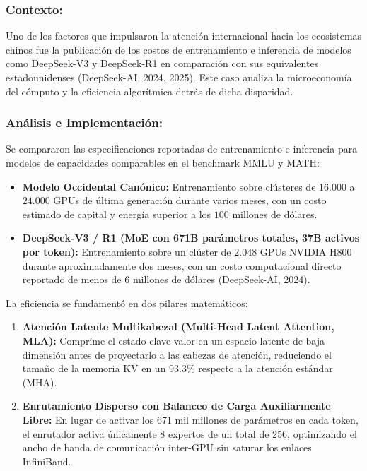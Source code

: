 \subsubsection*{Contexto:}
Uno de los factores que impulsaron la atención internacional hacia los ecosistemas chinos fue la publicación de los costos de entrenamiento e inferencia de modelos como DeepSeek-V3 y DeepSeek-R1 en comparación con sus equivalentes estadounidenses (DeepSeek-AI, 2024, 2025). Este caso analiza la microeconomía del cómputo y la eficiencia algorítmica detrás de dicha disparidad.

\subsubsection*{Análisis e Implementación:}
Se compararon las especificaciones reportadas de entrenamiento e inferencia para modelos de capacidades comparables en el benchmark MMLU y MATH:
\begin{itemize}
    \item \textbf{Modelo Occidental Canónico:} Entrenamiento sobre clústeres de $16.000$ a $24.000$ GPUs de última generación durante varios meses, con un costo estimado de capital y energía superior a los $100$ millones de dólares.
    \item \textbf{DeepSeek-V3 / R1 (MoE con 671B parámetros totales, 37B activos por token):} Entrenamiento sobre un clúster de $2.048$ GPUs NVIDIA H800 durante aproximadamente dos meses, con un costo computacional directo reportado de menos de $6$ millones de dólares (DeepSeek-AI, 2024).
\end{itemize}

La eficiencia se fundamentó en dos pilares matemáticos:
\begin{enumerate}[label=\arabic*., leftmargin=2em]
    \item \textbf{Atención Latente Multikabezal (Multi-Head Latent Attention, MLA):} Comprime el estado clave-valor en un espacio latente de baja dimensión antes de proyectarlo a las cabezas de atención, reduciendo el tamaño de la memoria KV en un $93.3\%$ respecto a la atención estándar (MHA).
    \item \textbf{Enrutamiento Disperso con Balanceo de Carga Auxiliarmente Libre:} En lugar de activar los 671 mil millones de parámetros en cada token, el enrutador activa únicamente 8 expertos de un total de 256, optimizando el ancho de banda de comunicación inter-GPU sin saturar los enlaces InfiniBand.
\end{enumerate}

